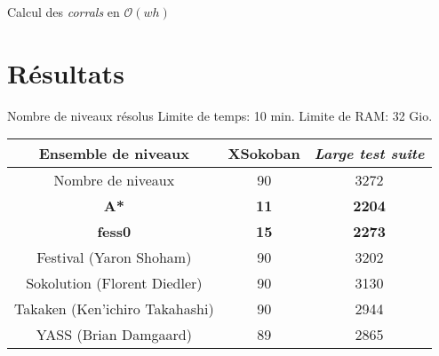 \begin{frame}{Calcul des \textit{corrals} en $\mathcal{O}(wh)$}
{
            }
        \end{frame}

    \section{Résultats}
        \begin{frame}{Nombre de niveaux résolus}
            \centering
            Limite de temps: 10 min. Limite de RAM: 32 Gio.

            \vspace{0.42cm}
            \begin{tabular}{|c|c|c|}
                \hline
                Ensemble de niveaux            & XSokoban    & \textit{Large test suite} \\
                \hline
                Nombre de niveaux              & 90          & 3272 \\
                \hline
                \textbf{A*}                    & \textbf{11} & \textbf{2204} \\
                \hline
                \textbf{fess0}                 & \textbf{15} & \textbf{2273} \\
                \hline
                Festival (Yaron Shoham)        & 90          & 3202 \\
                \hline
                Sokolution (Florent Diedler)   & 90          & 3130 \\
                \hline
                Takaken (Ken'ichiro Takahashi) & 90          & 2944 \\
                \hline
                YASS (Brian Damgaard)          & 89          & 2865 \\
                \hline
            \end{tabular}

        \end{frame}

